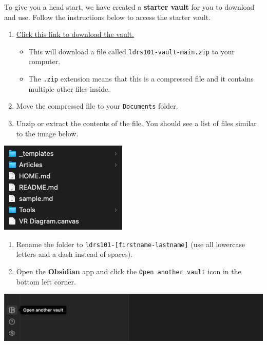 \documentclass[
]{book}
\providecommand{\tightlist}{%
  \setlength{\itemsep}{0pt}\setlength{\parskip}{0pt}}
\theoremstyle{definition}
\theoremstyle{definition}
\theoremstyle{definition}
\theoremstyle{definition}
\theoremstyle{remark}
\begin{document}
\begin{reflect}
To give you a head start, we have created a \textbf{starter vault} for you to download and use. Follow the instructions below to access the starter vault.

\begin{enumerate}
\def\labelenumi{\arabic{enumi}.}
\tightlist
\item
  \href{https://github.com/twu-innovation/ldrs101-vault/archive/refs/heads/main.zip}{Click this link to download the vault.}

  \begin{itemize}
  \tightlist
  \item
    This will download a file called \texttt{ldrs101-vault-main.zip} to your computer.
  \item
    The \texttt{.zip} extension means that this is a compressed file and it contains multiple other files inside.
  \end{itemize}
\item
  Move the compressed file to your \texttt{Documents} folder.
\item
  Unzip or extract the contents of the file. You should see a list of files similar to the image below.
\end{enumerate}

\includegraphics{assets/u1/vault-contents.png}

\begin{enumerate}
\def\labelenumi{\arabic{enumi}.}
\setcounter{enumi}{3}
\tightlist
\item
  Rename the folder to \texttt{ldrs101-{[}firstname-lastname{]}} (use all lowercase letters and a dash instead of spaces).
\item
  Open the \textbf{Obsidian} app and click the \texttt{Open\ another\ vault} icon in the bottom left corner.
\end{enumerate}

\includegraphics{assets/digital-literacy/obsidian2.png}


\end{reflect}
\end{document}
